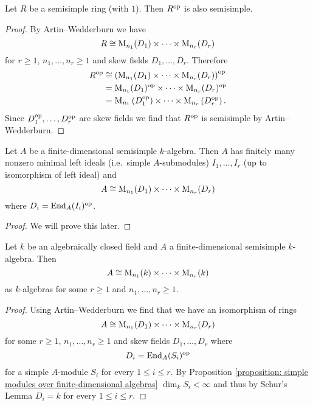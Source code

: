 \begin{corollary}
  Let $R$ be a semisimple ring (with $1$).
  Then $R^{\mathrm{op}}$ is also semisimple.
\end{corollary}
\begin{proof}
  By Artin--Wedderburn we have
  \[
    R \cong \operatorname{M}_{n_1}(D_1) \times \dotsm \times \operatorname{M}_{n_r}(D_r)
  \]
  for $r \geq 1$, $n_1, \dotsc, n_r \geq 1$ and skew fields $D_1, \dotsc, D_r$.
  Therefore
  \begin{align*}
            R^{\mathrm{op}}
    &\cong  \left( \operatorname{M}_{n_1}(D_1) \times \dotsm \times \operatorname{M}_{n_r}(D_r) \right)^{\mathrm{op}} \\
    &=      \operatorname{M}_{n_1}(D_1)^{\mathrm{op}} \times \dotsm \times \operatorname{M}_{n_r}(D_r)^{\mathrm{op}} \\
    &=      \operatorname{M}_{n_1}\left( D_1^{\mathrm{op}} \right) \times \dotsm \times \operatorname{M}_{n_r}\left( D_r^{\mathrm{op}} \right).
  \end{align*}
  Since $D_1^{\mathrm{op}}, \dotsc, D_r^{\mathrm{op}}$ are skew fields we find that $R^{\mathrm{op}}$ is semisimple by Artin--Wedderburn.
\end{proof}


\begin{corollary}
  Let $A$ be a finite-dimensional semisimple $k$-algebra.
  Then $A$ has finitely many nonzero minimal left ideals (i.e.\ simple $A$-submodules) $I_1, \dotsc, I_r$ (up to isomorphism of left ideal) and
  \[
    A \cong \operatorname{M}_{n_1}(D_1) \times \dotsm \times \operatorname{M}_{n_r}(D_r)
  \]
  where $D_i = \operatorname{End}_A(I_i)^{\mathrm{op}}$.
\end{corollary}
\begin{proof}
  We will prove this later.
\end{proof}


\begin{corollary}\label{corollary: semisimple algebra product of matrix algebras over field}
  Let $k$ be an algebraically closed field and $A$ a finite-dimensional semisimple $k$-algebra.
  Then
  \[
    A \cong \operatorname{M}_{n_1}(k) \times \dotsm \times \operatorname{M}_{n_r}(k)
  \]
  as $k$-algebras for some $r \geq 1$ and $n_1, \dotsc, n_r \geq 1$.
\end{corollary}
\begin{proof}
  Using Artin--Wedderburn we find that we have an isomorphism of rings
  \[
    A \cong \operatorname{M}_{n_1}(D_1) \times \dotsm \times \operatorname{M}_{n_r}(D_r)
  \]
  for some $r \geq 1$, $n_1, \dotsc, n_r \geq 1$ and skew fields $D_1, \dotsc, D_r$ where
  \[
    D_i = \operatorname{End}_A(S_i)^{\mathrm{op}}
  \]
  for a simple $A$-module $S_i$ for every $1 \leq i \leq r$.
  By Proposition \ref{proposition: simple modules over finite-dimensional algebras} $\dim_k S_i < \infty$ and thus by Schur’s Lemma $D_i = k$ for every $1 \leq i \leq r$.
\end{proof}


